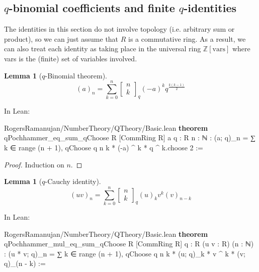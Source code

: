 \documentclass[12pt]{amsart}
\newtheorem{lemma}[theorem]{Lemma}
\theoremstyle{definition}
\theoremstyle{remark}
\numberwithin{equation}{subsection}
\newcommand{\Z}{\mathbb Z}
\newcommand{\kw}[1]{\textcolor{keywordcolor}{\textbf{#1}}}
\newcommand{\var}[1]{\textcolor{tacticcolor}{#1}}
\newcommand{\prop}[1]{\textcolor{sortcolor}{#1}}
\newcommand{\num}[1]{\textcolor{numcolor}{#1}}
\newcommand{\imp}[1]{\textcolor{commentcolor}{\textbraceleft#1\textbraceright}}
\begin{document}
\subsection{\texorpdfstring{$q$}{q}-binomial coefficients and finite \texorpdfstring{$q$}{q}-identities}

The identities in this section do not involve topology (i.e. arbitrary sum or product), so we can just assume that $R$ is a commutative ring. As a result, we can also treat each identity as taking place in the universal ring $\Z[\mathrm{vars}]$ where vars is the (finite) set of variables involved.

\begin{lemma}[$q$-Binomial theorem]
    \label{lem:binom-thm}
    \begin{equation}
        (a)_n = \sum_{k=0}^{n} \begin{bmatrix} n \\ k \end{bmatrix}_q (-a)^k q^{\frac{k(k-1)}{2}}  
    \end{equation}
\end{lemma}

In Lean:

\begin{code}{RogersRamanujan/NumberTheory/QTheory/Basic.lean}
\kw{theorem} qPochhammer_eq_sum_qChoose \imp{R} [CommRing \var{R}] \imp{a q : R} \imp{n : ℕ} :
  (\var{a}; \var{q})_\var{n} = ∑ \var{k} ∈ range (\var{n} + \num{1}), qChoose \var{q} \var{n} \var{k} * (-\var{a}) ^ \var{k} * \var{q} ^ \var{k}.\prop{choose} \num{2} :=
\end{code}

\begin{proof}
    Induction on $n$.
\end{proof}

\begin{lemma}[$q$-Cauchy identity]
    \label{lem:binomial_cauchy}
    \begin{equation}
        (uv)_n = \sum_{k=0}^{n} \begin{bmatrix}
            n \\ k
        \end{bmatrix}_q (u)_k v^k (v)_{n-k}
    \end{equation}
\end{lemma}

In Lean:

\begin{code}{RogersRamanujan/NumberTheory/QTheory/Basic.lean}
\kw{theorem} qPochhammer_mul_eq_sum_qChoose \imp{R} [CommRing \var{R}] \imp{q : R} (\var{u} \var{v} : \var{R}) (\var{n} : ℕ) :
  (\var{u} * \var{v}; \var{q})_\var{n} = ∑ \var{k} ∈ range (\var{n} + \num{1}), qChoose \var{q} \var{n} \var{k} * (\var{u}; \var{q})_\var{k} * \var{v} ^ \var{k} * (\var{v}; \var{q})_(\var{n} - \var{k}) :=
\end{code}
\end{document}

